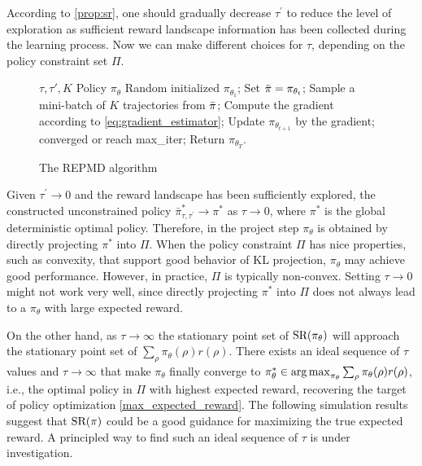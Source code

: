 According to \cref{prop:sr}, one should gradually decrease $\tau^{\prime}$ to reduce the level of exploration as sufficient reward landscape information has been collected during the learning process. Now we can make different choices for $\tau$, depending on the policy constraint set $\Pi$.

\begin{wrapfigure}{r}{0.56\textwidth}
	\begin{minipage}{0.56\textwidth}
		\begin{algorithm}[H]
			\caption{\label{alg:repmd}  The REPMD algorithm}
			\begin{algorithmic}[1]
				\INPUT $\tau, \tau', K$
				\OUTPUT  Policy $\pi_\theta$
				\STATE Random initialized $\pi_{\theta_1}$;
				\STATE Set $\bar{\pi} = \pi_{\theta_t}$;
				\REPEAT 
				\STATE Sample a mini-batch of $K$ trajectories from $\bar{\pi}$;
				\STATE Compute the gradient according to \cref{eq:gradient_estimator};
				\STATE Update $\pi_{\theta_{t+1}}$ by the gradient;
				\UNTIL converged or reach max\_iter;
				\ENDFOR
				\STATE Return $\pi_{\theta_T}$.
			\end{algorithmic}
		\end{algorithm}
	\end{minipage}
\end{wrapfigure}

Given $\tau^{\prime} \to 0$ and the reward landscape has been sufficiently explored,
the constructed unconstrained policy $\bar{\pi}_{\tau,\tau^{\prime}}^* \to \pi^*$ as $\tau \to 0$, where $\pi^*$ is the global deterministic optimal policy. 
Therefore, in the project step $\pi_\theta$ is obtained by directly projecting $\pi^*$ into $\Pi$. When the policy constraint $\Pi$ has nice properties, such as convexity, that support good behavior of KL projection, $\pi_\theta$ may achieve good performance.
However, in practice, $\Pi$ is typically non-convex. Setting $\tau \to 0$ might not work very well, since directly projecting $\pi^*$ into $\Pi$ does not always lead to a $\pi_\theta$ with large expected reward.

On the other hand, as $\tau \to \infty$ the stationary point set of $\text{SR}(\pi_\theta)$ will approach the stationary point set of $\sum_{\rho}{ \pi_\theta(\rho) r(\rho) }$.
There exists an ideal sequence of $\tau$ values and $\tau \to \infty$ that make $\pi_\theta$ finally converge to $\pi_\theta^* \in \operatorname*{arg\,max}_{\pi_\theta}{ \sum_{\rho}{\pi_\theta(\rho) r(\rho)} }$, i.e., the optimal policy in $\Pi$ with highest expected reward, recovering the target of policy optimization \cref{max_expected_reward}. 
The following simulation results suggest that $\text{SR}(\pi)$ could be a good guidance for maximizing the true expected reward.
A principled way to find such an ideal sequence of $\tau$ is under investigation.

